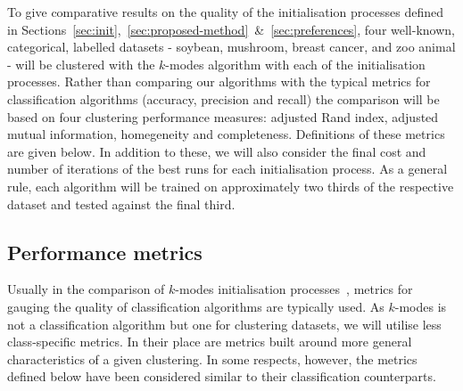 To give comparative results on the quality of the initialisation processes 
defined in
Sections~\ref{sec:init},~\ref{sec:proposed-method}~\&~\ref{sec:preferences},
four well-known, categorical, labelled datasets - soybean, mushroom, breast
cancer, and zoo animal - will be clustered with the \(k\)-modes algorithm with
each of the initialisation processes. Rather than comparing our algorithms with
the typical metrics for classification algorithms (accuracy, precision and
recall) the comparison will be based on four clustering performance measures:
adjusted Rand index, adjusted mutual information, homegeneity and completeness.
Definitions of these metrics are given below. In addition to these, we will also
consider the final cost and number of iterations of the best runs for each
initialisation process. As a general rule, each algorithm will be trained on
approximately two thirds of the respective dataset and tested against the final
third.

\subsection{Performance metrics}\label{subsec:metrics}

Usually in the comparison of \(k\)-modes initialisation
processes~\cite{Huang98}\cite{Cao09}, metrics for gauging the quality of
classification algorithms are typically used. As \(k\)-modes is not a
classification algorithm but one for clustering datasets, we will utilise less
class-specific metrics. In their place are metrics built around more general
characteristics of a given clustering. In some respects, however, the metrics
defined below have been considered similar to their classification
counterparts.\\

